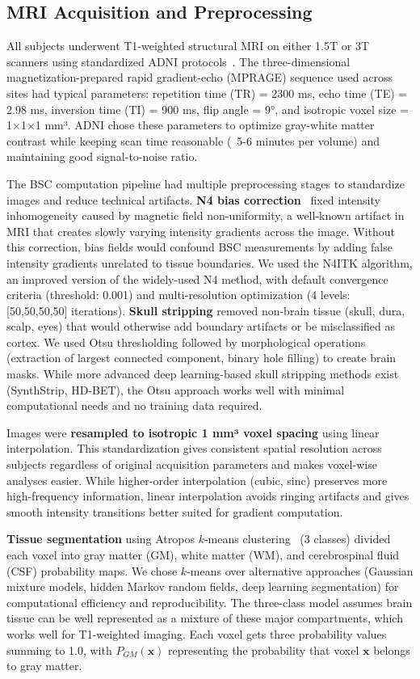 \documentclass[blue]{ludusofficial}  %
\begin{document}
\subsection{MRI Acquisition and Preprocessing}

All subjects underwent T1-weighted structural MRI on either 1.5T or 3T scanners using standardized ADNI protocols~\cite{jack2008adni_mri}. The three-dimensional magnetization-prepared rapid gradient-echo (MPRAGE) sequence used across sites had typical parameters: repetition time (TR) = 2300 ms, echo time (TE) = 2.98 ms, inversion time (TI) = 900 ms, flip angle = 9°, and isotropic voxel size = 1×1×1 mm³. ADNI chose these parameters to optimize gray-white matter contrast while keeping scan time reasonable (~5-6 minutes per volume) and maintaining good signal-to-noise ratio.

The BSC computation pipeline had multiple preprocessing stages to standardize images and reduce technical artifacts. \textbf{N4 bias correction}~\cite{tustison2010n4} fixed intensity inhomogeneity caused by magnetic field non-uniformity, a well-known artifact in MRI that creates slowly varying intensity gradients across the image. Without this correction, bias fields would confound BSC measurements by adding false intensity gradients unrelated to tissue boundaries. We used the N4ITK algorithm, an improved version of the widely-used N4 method, with default convergence criteria (threshold: 0.001) and multi-resolution optimization (4 levels: [50,50,50,50] iterations). \textbf{Skull stripping} removed non-brain tissue (skull, dura, scalp, eyes) that would otherwise add boundary artifacts or be misclassified as cortex. We used Otsu thresholding followed by morphological operations (extraction of largest connected component, binary hole filling) to create brain masks. While more advanced deep learning-based skull stripping methods exist (SynthStrip, HD-BET), the Otsu approach works well with minimal computational needs and no training data required.

Images were \textbf{resampled to isotropic 1 mm³ voxel spacing} using linear interpolation. This standardization gives consistent spatial resolution across subjects regardless of original acquisition parameters and makes voxel-wise analyses easier. While higher-order interpolation (cubic, sinc) preserves more high-frequency information, linear interpolation avoids ringing artifacts and gives smooth intensity transitions better suited for gradient computation.

\textbf{Tissue segmentation} using Atropos $k$-means clustering~\cite{avants2011atropos} (3 classes) divided each voxel into gray matter (GM), white matter (WM), and cerebrospinal fluid (CSF) probability maps. We chose $k$-means over alternative approaches (Gaussian mixture models, hidden Markov random fields, deep learning segmentation) for computational efficiency and reproducibility. The three-class model assumes brain tissue can be well represented as a mixture of these major compartments, which works well for T1-weighted imaging. Each voxel gets three probability values summing to 1.0, with $P_{GM}(\mathbf{x})$ representing the probability that voxel $\mathbf{x}$ belongs to gray matter.
\end{document}
